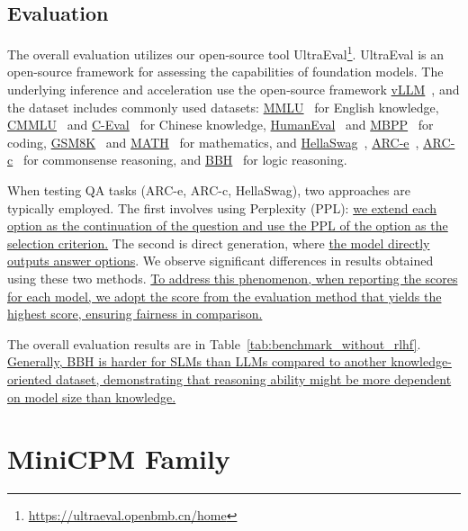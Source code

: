 \subsection{Evaluation}
\label{sec:evaluation}

The overall evaluation utilizes our open-source tool UltraEval\footnote{\url{https://ultraeval.openbmb.cn/home}}. UltraEval is an open-source framework for assessing the capabilities of foundation models. The underlying inference and acceleration use the open-source framework \uline{vLLM}~\citep{kwon2023efficient}, and the dataset includes commonly used datasets: \uline{MMLU}~\citep{hendrycks2020measuring} for English knowledge, \uline{CMMLU}~\citep{li2024cmmlu} and \uline{C-Eval}~\citep{huang2024c} for Chinese knowledge, \uline{HumanEval}~\citep{chen2021evaluating} and \uline{MBPP}~\citep{austin2021program} for coding, \uline{GSM8K}~\citep{cobbe2021training} and \uline{MATH}~\citep{hendrycks2021measuring} for mathematics, and \uline{HellaSwag}~\citep{zellers2019hellaswag}, \uline{ARC-e}~\citep{clark2018think}, \uline{ARC-c}~\citep{clark2018think} for commonsense reasoning, and \uline{BBH}~\citep{suzgun2022challenging} for logic reasoning.

When testing QA tasks (ARC-e, ARC-c, HellaSwag), two approaches are typically employed. The first involves using Perplexity (PPL): \uline{we extend each option as the continuation of the question and use the PPL of the option as the selection criterion.} The second is direct generation, where \uline{the model directly outputs answer options}. We observe significant differences in results obtained using these two methods. \uline{To address this phenomenon, when reporting the scores for each model, we adopt the score from the evaluation method that yields the highest score, ensuring fairness in comparison.}

The overall evaluation results are in Table~\ref{tab:benchmark_without_rlhf}. \uline{Generally, BBH is harder for SLMs than LLMs compared to another knowledge-oriented dataset, demonstrating that reasoning ability might be more dependent on model size than knowledge.}



\section{MiniCPM Family}




